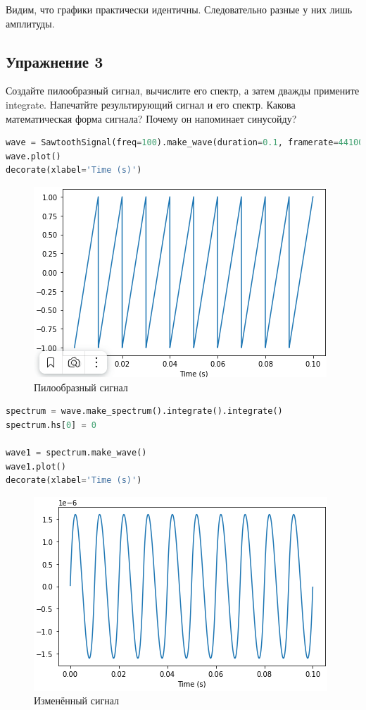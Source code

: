 Видим, что графики практически идентичны. Следовательно разные у них лишь амплитуды.

\subsection{Упражнение 3}

Создайте пилообразный сигнал, вычислите его спектр, а затем дважды примените integrate. Напечатйте результирующий сигнал и его спектр. Какова математическая форма сигнала? Почему он напоминает синусойду?

\begin{lstlisting}[language=Python]
wave = SawtoothSignal(freq=100).make_wave(duration=0.1, framerate=44100)
wave.plot()
decorate(xlabel='Time (s)')
\end{lstlisting}
\begin{figure}[H]
	\begin{center}
		\includegraphics[scale=1]{fig/lab09/lab9_8.png}
		\caption{Пилообразный сигнал}
	\end{center}
\end{figure}

\begin{lstlisting}[language=Python]
spectrum = wave.make_spectrum().integrate().integrate()
spectrum.hs[0] = 0

wave1 = spectrum.make_wave()
wave1.plot()
decorate(xlabel='Time (s)')
\end{lstlisting}
\begin{figure}[H]
	\begin{center}
		\includegraphics[scale=1]{fig/lab09/lab9_9.png}
		\caption{Изменённый сигнал}
	\end{center}
\end{figure}

